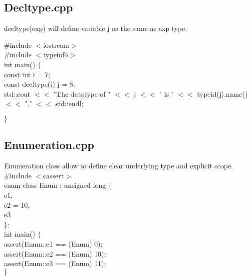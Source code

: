 \documentclass[12pt]{report}
\begin{document}
\subsection{Decltype.cpp}
\label{Decltype}
{\scriptsize decltype(exp) will define variable j as the same as exp type.

\#include $<$iostream$>$\\
\#include $<$typeinfo$>$\\

int main() $\lbrace$\\
  const int i = 7;\\
  const decltype(i) j = 8;\\

  std::cout $<<$ "The datatype of  " $<<$ j $<<$ " is " $<<$ typeid(j).name() $<<$ "." $<<$ std::endl;

$\rbrace$
}
\subsection{Enumeration.cpp}
\label{Enumeration}
{\scriptsize 
Enumeration class allow to define clear underlying type and explicit scope.\\

\#include $<$cassert$>$\\

enum class Enum : unsigned long $\lbrace$\\
  e1,\\
  e2 = 10,\\
  e3\\
$\rbrace$;\\

int main() $\lbrace$\\

 assert(Enum::e1 == (Enum) 0);\\
 assert(Enum::e2 == (Enum) 10);\\
 assert(Enum::e3 == (Enum) 11);\\
$\rbrace$
}
\end{document}
